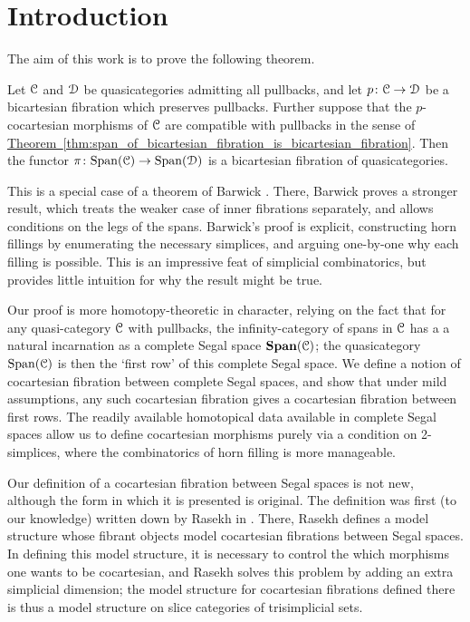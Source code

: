 \documentclass[main.tex]{subfiles}
\begin{document}
\section*{Introduction}
\label{sec:introduction}

The aim of this work is to prove the following theorem.

\begin{theorem*}
  Let $\mathcal{C}$ and $\mathcal{D}$ be quasicategories admitting all pullbacks, and let $p\colon \mathcal{C} \to \mathcal{D}$ be a bicartesian fibration which preserves pullbacks. Further suppose that the $p$-cocartesian morphisms of $\mathcal{C}$ are compatible with pullbacks in the sense of \hyperref[thm:span_of_bicartesian_fibration_is_bicartesian_fibration]{Theorem~\ref*{thm:span_of_bicartesian_fibration_is_bicartesian_fibration}}. Then the functor $\pi\colon \mathrm{Span}(\mathcal{C}) \to \mathrm{Span}(\mathcal{D})$ is a bicartesian fibration of quasicategories.
\end{theorem*}

This is a special case of a theorem of Barwick \cite{spectralmackeyfunctors1}. There, Barwick proves a stronger result, which treats the weaker case of inner fibrations separately, and allows conditions on the legs of the spans. Barwick's proof is explicit, constructing horn fillings by enumerating the necessary simplices, and arguing one-by-one why each filling is possible. This is an impressive feat of simplicial combinatorics, but provides little intuition for why the result might be true.

Our proof is more homotopy-theoretic in character, relying on the fact that for any quasi-category $\mathcal{C}$ with pullbacks, the infinity-category of spans in $\mathcal{C}$ has a a natural incarnation as a complete Segal space $\mathbf{Span}(\mathcal{C})$; the quasicategory $\mathrm{Span}(\mathcal{C})$ is then the `first row' of this complete Segal space. We define a notion of cocartesian fibration between complete Segal spaces, and show that under mild assumptions, any such cocartesian fibration gives a cocartesian fibration between first rows. The readily available homotopical data available in complete Segal spaces allow us to define cocartesian morphisms purely via a condition on 2-simplices, where the combinatorics of horn filling is more manageable.

Our definition of a cocartesian fibration between Segal spaces is not new, although the form in which it is presented is original. The definition was first (to our knowledge) written down by Rasekh in \cite{rasekhcartesianfibrations}. There, Rasekh defines a model structure whose fibrant objects model cocartesian fibrations between Segal spaces. In defining this model structure, it is necessary to control the which morphisms one wants to be cocartesian, and Rasekh solves this problem by adding an extra simplicial dimension; the model structure for cocartesian fibrations defined there is thus a model structure on slice categories of trisimplicial sets.
\end{document}
